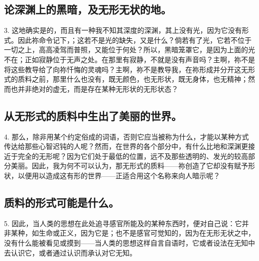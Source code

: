 \subsection{论深渊上的黑暗，及无形无状的地。}

3. 这地确实是的，而且有一种我不知其深度的深渊，其上没有光，因为它没有形式。因此祢命令记下，；这若不是光的缺失，又是什么？倘若有了光，它若不位于一切之上，高高凌驾而普照，又能位于何处？所以，黑暗笼罩它，是因为上面的光不在；正如寂静位于无声之处。在那里有寂静，不就是没有声音吗？主啊，祢不是将这些教导给了向祢忏悔的灵魂吗？主啊，祢不是教导我，在祢形成并分开这无形式的质料之前，那里什么也没有，既无颜色，也无形状，既无身体，也无精神；然而也并非绝对的虚无，而是存在某种无形状的无形状态？\par


\subsection{从无形式的质料中生出了美丽的世界。}

4. 那么，除非用某个约定俗成的词语，否则它应当被称为什么，才能以某种方式传达给那些心智迟钝的人呢？然而，在世界的各个部分中，有什么比地和深渊更接近于完全的无形呢？因为它们处于最低的位置，远不及那些透明的、发光的较高部分美丽。因此，我为何不可以认为，那无形式的质料——祢创造了它却没有赋予形状，以便用以造成这有形的世界——正适合用这个名称来向人暗示呢？\par


\subsection{质料的形式可能是什么。}

5. 因此，当人类的思想在此处追寻感官所能及的某种东西时，便对自己说：它并非某种，如生命或正义，因为它是；也不是感官可觉知的，因为在无形无状之中，没有什么能被看见或摸到——当人类的思想这样自言自语时，它或者设法在无知中去认识它，或者通过认识而承认对它无知。\par



